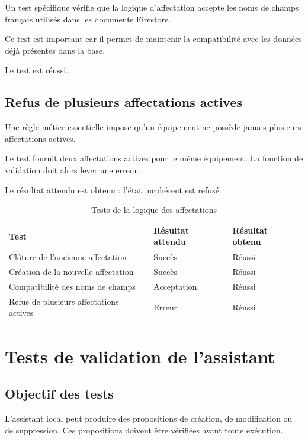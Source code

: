\documentclass{rapportENSIAS}
\begin{document}
Un test spécifique vérifie que la logique d’affectation accepte les noms de champs français utilisés dans les documents Firestore.

Ce test est important car il permet de maintenir la compatibilité avec les données déjà présentes dans la base.

Le test est réussi.

\subsection{Refus de plusieurs affectations actives}

Une règle métier essentielle impose qu’un équipement ne possède jamais plusieurs affectations actives.

Le test fournit deux affectations actives pour le même équipement. La fonction de validation doit alors lever une erreur.

Le résultat attendu est obtenu : l’état incohérent est refusé.

\begin{table}[htbp]
    \centering
    \caption{Tests de la logique des affectations}
    \label{tab:tests-affectations}
    \begin{tabular}{|p{7cm}|p{3cm}|p{3cm}|}
        \hline
        \textbf{Test} & \textbf{Résultat attendu} & \textbf{Résultat obtenu} \\
        \hline
        Clôture de l’ancienne affectation & Succès & Réussi \\
        \hline
        Création de la nouvelle affectation & Succès & Réussi \\
        \hline
        Compatibilité des noms de champs & Acceptation & Réussi \\
        \hline
        Refus de plusieurs affectations actives & Erreur & Réussi \\
        \hline
    \end{tabular}
\end{table}

\section{Tests de validation de l’assistant}

\subsection{Objectif des tests}

L’assistant local peut produire des propositions de création, de modification ou de suppression. Ces propositions doivent être vérifiées avant toute exécution.
\end{document}
